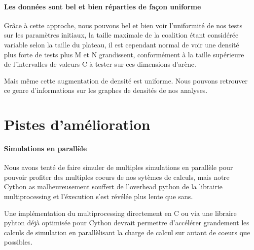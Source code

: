 		\paragraph{Les données sont bel et bien réparties de façon uniforme}
		Grâce à cette approche, nous pouvons bel et bien voir l'uniformité de nos tests sur les paramètres initiaux, la taille maximale de la coalition étant considérée variable selon la taille du plateau, il est cependant normal de voir une densité plus forte de tests plus M et N grandissent, conformément à la taille supérieure de l'intervalles de valeurs C à tester sur ces dimensions d'arène.
		
		Mais même cette augmentation de densité est uniforme.
		Nous pouvons retrouver ce genre d'informations sur les graphes de densités de nos analyses.
		

	\section{Pistes d'amélioration}
	
		\paragraph{Simulations en parallèle}
		Nous avons tenté de faire simuler de multiples simulations en parallèle pour pouvoir profiter des multiples coeurs de nos sytèmes de calculs, mais notre Cython as malheureusement souffert de l'overhead python de la librairie multiprocessing et l'éxecution s'est révélée plus lente que sans.
		
		Une implémentation du multiprocessing directement en C ou via une libraire pyhton déjà optimisée pour Cython devrait permettre d'accélérer grandement les calculs de simulation en parallèlisant la charge de calcul sur autant de coeurs que possibles.